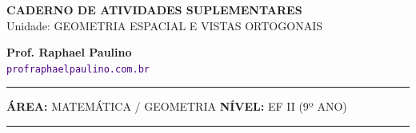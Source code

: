 \documentclass[twoside, 10pt, a4paper]{article}
\begin{document}
\thispagestyle{empty}
\color{Cinzablack}
\vspace*{-1.8cm}

\noindent
\begin{minipage}{\textwidth}
    \selectfont
    \noindent
    \begin{minipage}[t]{0.70\linewidth}
        {\Large \bfseries \MakeUppercase{Caderno de Atividades Suplementares}}\\[0.1cm]
        {\large \textmd{\textcolor{CinzaEscuro}{Unidade: GEOMETRIA ESPACIAL E VISTAS ORTOGONAIS}}}
    \end{minipage}%
    \begin{minipage}[t]{0.30\linewidth}
        \raggedleft
        \small \textbf{Prof. Raphael Paulino}\\
        \textsf{\small \textcolor{indigo}{\texttt{profraphaelpaulino.com.br}}}
    \end{minipage}
    
    \vspace{0.15cm}
    \noindent\rule{\linewidth}{1.2pt}
    \vspace{-0.1cm}
    \footnotesize\textsf{\textbf{ÁREA:} MATEMÁTICA / GEOMETRIA \hfill \textbf{NÍVEL:} EF II (9º ANO)}
    \vspace{0.1cm}
    \noindent\rule{\linewidth}{0.4pt}
\end{minipage}
\end{document}
